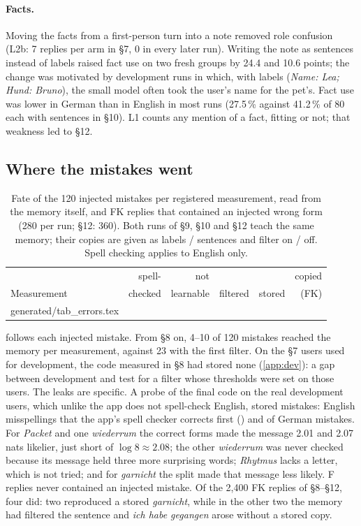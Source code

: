 \documentclass[10pt,twocolumn]{article}
\makeatletter
\newcommand*{\tablebody}[1]{\@@input generated/#1.tex }
\newcommand{\pct}{\,\%}
\makeatother
\begin{document}
\paragraph{Facts.} Moving the facts from a first-person turn into a note removed role confusion (L2b: 7 replies per arm
in \S7, 0 in every later run). Writing the note as sentences instead of labels raised fact use on two fresh groups by 24.4 and
10.6 points; the change was motivated by development runs in which, with labels (\emph{Name: Lea; Hund: Bruno}), the
small model often took the user's name for the pet's. Fact
use was lower in German than in English in most runs (27.5\pct{} against 41.2\pct{} of 80 each with sentences in
\S10). L1 counts any
mention of a fact, fitting or not; that weakness led to \S12.

\subsection{Where the mistakes went}\label{sec:mistakes}

\begin{table}[t]
\centering
\footnotesize
\setlength{\tabcolsep}{3.5pt}
\caption{Fate of the 120 injected mistakes per registered measurement, read from the memory itself, and FK replies that
contained an injected wrong form (280 per run; \S12: 360). Both runs of \S9, \S10 and \S12 teach the same memory; their
copies are given as labels / sentences and filter on / off. Spell checking applies to English only.}
\label{tab:errors}
\begin{tabular}{@{}lrrrrr@{}}
\toprule
& spell- & not & & & copied \\
Measurement & checked & learnable & filtered & stored & (FK) \\
\midrule
\tablebody{tab_errors}
\bottomrule
\end{tabular}
\end{table}

 follows each injected mistake. From \S8 on, 4--10 of 120 mistakes reached the memory per measurement,
against 23 with the first filter. On the \S7 users used for development, the code measured in \S8 had stored none
(\cref{app:dev}): a gap between development and test for a filter whose thresholds were set on those users. The leaks
are specific. A probe of the final code on the real development users, which unlike the app does not spell-check
English, stored  mistakes:  English misspellings that the app's spell checker
corrects first () and  of  German mistakes. For \emph{Packet} and
one \emph{wiederrum} the correct forms made the message 2.01 and 2.07 nats likelier, just short of $\log 8 \approx 2.08$;
the other \emph{wiederrum} was never checked because its message held three more surprising words; \emph{Rhytmus} lacks a
letter, which is not tried; and for \emph{garnicht} the split made that message less likely. F replies never contained an
injected mistake. Of the 2{,}400 FK replies of \S8--\S12, four did: two reproduced a stored \emph{garnicht}, while in the
other two the memory had filtered the sentence and \emph{ich habe gegangen} arose without a stored copy.
\end{document}
